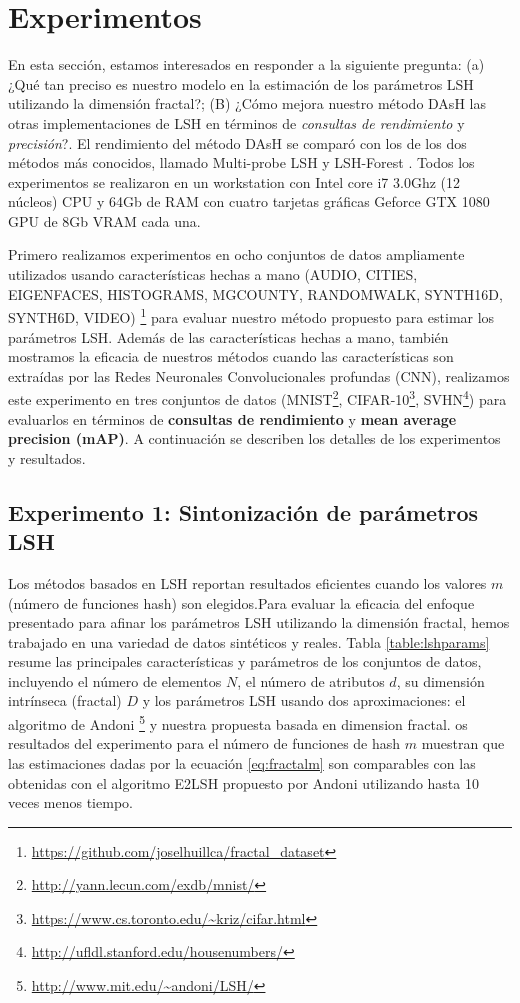  
\section{Experimentos}

En esta sección, estamos interesados en responder a la siguiente pregunta: (a) ¿Qué tan preciso es nuestro modelo en la estimación de los parámetros LSH utilizando la dimensión fractal?; (B) ¿Cómo mejora nuestro método DAsH las otras implementaciones de LSH en términos de \textit{consultas de rendimiento} y \textit{precisión}?. El rendimiento del método DAsH se comparó con los de los dos métodos más conocidos, llamado Multi-probe LSH \cite{multiprobe} y LSH-Forest \cite{lshforest}. Todos los experimentos se realizaron en un workstation con Intel core i7  3.0Ghz (12 núcleos) CPU y 64Gb de RAM con cuatro tarjetas gráficas Geforce GTX 1080 GPU de 8Gb VRAM cada una.
 
Primero realizamos experimentos en ocho conjuntos de datos ampliamente utilizados usando características hechas a mano (AUDIO, CITIES, EIGENFACES, HISTOGRAMS, MGCOUNTY, RANDOMWALK, SYNTH16D, SYNTH6D, VIDEO) \footnote{\url{https://github.com/joselhuillca/fractal_dataset}} para evaluar nuestro método propuesto para estimar los parámetros LSH. Además de las características hechas a mano, también mostramos la eficacia de nuestros métodos cuando las características son extraídas por las Redes Neuronales Convolucionales profundas (CNN), realizamos este experimento en tres conjuntos de datos (MNIST\footnote{\url{http://yann.lecun.com/exdb/mnist/}}, CIFAR-10\footnote{\url{https://www.cs.toronto.edu/~kriz/cifar.html}}, SVHN\footnote{\url{http://ufldl.stanford.edu/housenumbers/}}) para evaluarlos en términos de \textbf{consultas de rendimiento} y \textbf{mean average precision (mAP)}. A continuación se describen los detalles de los experimentos y resultados.

\subsection{Experimento 1: Sintonización de parámetros LSH}

Los métodos basados en LSH reportan resultados eficientes cuando los valores $m$ (número de funciones hash) son elegidos.Para evaluar la eficacia del enfoque presentado para afinar los parámetros LSH utilizando la dimensión fractal, hemos trabajado en una variedad de datos sintéticos y reales. Tabla \ref{table:lshparams} resume las principales características y parámetros de los conjuntos de datos, incluyendo el número de elementos $N$, el número de atributos $d$, su dimensión intrínseca (fractal) $D$ y los parámetros LSH usando dos aproximaciones: el algoritmo de Andoni \footnote{\url{http://www.mit.edu/~andoni/LSH/}}  y nuestra propuesta basada en dimension fractal.  os resultados del experimento para el número de funciones de hash $m$ muestran que las estimaciones dadas por la ecuación \ref{eq:fractalm} son comparables con las obtenidas con el algoritmo E2LSH propuesto por Andoni utilizando hasta 10 veces menos tiempo.
 
